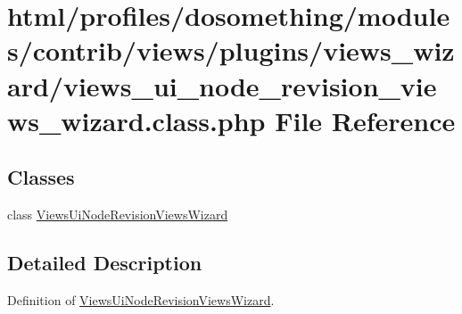 \hypertarget{views__ui__node__revision__views__wizard_8class_8php}{
\section{html/profiles/dosomething/modules/contrib/views/plugins/views\_\-wizard/views\_\-ui\_\-node\_\-revision\_\-views\_\-wizard.class.php File Reference}
\label{views__ui__node__revision__views__wizard_8class_8php}
}
\subsection*{Classes}
\begin{DoxyCompactItemize}
\item 
class \hyperlink{classViewsUiNodeRevisionViewsWizard}{ViewsUiNodeRevisionViewsWizard}
\end{DoxyCompactItemize}


\subsection{Detailed Description}
Definition of \hyperlink{classViewsUiNodeRevisionViewsWizard}{ViewsUiNodeRevisionViewsWizard}. 